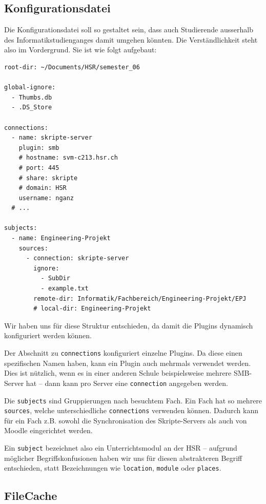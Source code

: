 \documentclass[a4paper]{article}
\begin{document}
\subsection{Konfigurationsdatei}
Die Konfigurationsdatei soll so gestaltet sein, dass auch Studierende ausserhalb des Informatikstudienganges damit umgehen könnten. Die Verständlichkeit steht also im Vordergrund. Sie ist wie folgt aufgebaut:

\begin{verbatim}
root-dir: ~/Documents/HSR/semester_06

global-ignore:
  - Thumbs.db
  - .DS_Store

connections:
  - name: skripte-server
    plugin: smb
    # hostname: svm-c213.hsr.ch
    # port: 445
    # share: skripte
    # domain: HSR
    username: nganz
  # ...

subjects:
  - name: Engineering-Projekt
    sources:
      - connection: skripte-server
        ignore:
          - SubDir
          - example.txt
        remote-dir: Informatik/Fachbereich/Engineering-Projekt/EPJ
        # local-dir: Engineering-Projekt
\end{verbatim}

Wir haben uns für diese Struktur entschieden, da damit die Plugins dynamisch konfiguriert werden können.

Der Abschnitt zu \verb|connections| konfiguriert einzelne Plugins.
Da diese einen spezifischen Namen haben, kann ein Plugin auch mehrmals verwendet werden.
Dies ist nützlich, wenn es in einer anderen Schule beispielsweise mehrere
SMB-Server hat -- dann kann pro Server eine \verb|connection| angegeben werden.

Die \verb|subjects| sind Gruppierungen nach besuchtem Fach.
Ein Fach hat so mehrere \verb|sources|, welche unterschiedliche \verb|connections| verwenden können.
Dadurch kann für ein Fach z.B. sowohl die Synchronisation des Skripte-Servers als auch von Moodle eingerichtet werden.

Ein \verb|subject| bezeichnet also ein Unterrichtsmodul an der HSR -- aufgrund möglicher Begriffskonfusionen haben wir uns für diesen abstrakteren Begriff entschieden, statt Bezeichnungen wie \verb|location|, \verb|module| oder \verb|places|.

\pagebreak

\subsection{FileCache}
\end{document}
